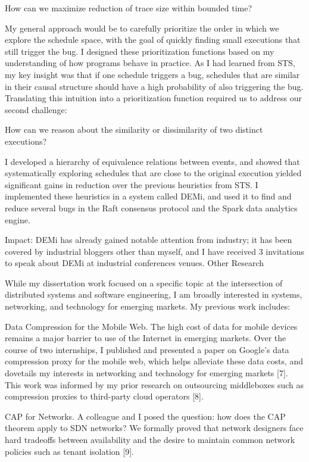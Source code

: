 	How can we maximize reduction of trace size within bounded time?

My general approach would be to carefully prioritize the order in which we explore the schedule space, with the goal of quickly finding small executions that still trigger the bug. I designed these prioritization functions based on my understanding of how programs behave in practice. As I had learned from STS, my key insight was that if one schedule triggers a bug, schedules that are similar in their causal structure should have a high probability of also triggering the bug. Translating this intuition into a prioritization function required us to address our second challenge: 

How can we reason about the similarity or dissimilarity of two distinct executions?

I developed a hierarchy of equivalence relations between events, and showed
that systematically exploring schedules that are close to the original
execution yielded significant gains in reduction over the previous
heuristics from STS. I implemented these heuristics in a system called DEMi,
and used it to find and reduce several bugs in the Raft consensus protocol and the Spark data analytics engine.

Impact: DEMi has already gained notable attention from industry; it has been covered by industrial bloggers other than myself, and I have received 3 invitations to speak about DEMi at industrial conferences venues.
Other Research

While my dissertation work focused on a specific topic at the intersection of distributed systems and software engineering, I am broadly interested in systems, networking, and technology for emerging markets. My previous work includes:

Data Compression for the Mobile Web. The high cost of data for mobile devices remains a major barrier to use of the Internet in emerging markets. Over the course of two internships, I published and presented a paper on Google’s data compression proxy for the mobile web, which helps alleviate these data costs, and dovetails my interests in networking and technology for emerging markets [7]. This work was informed by my prior research on outsourcing middleboxes such as compression proxies to third-party cloud operators [8].

CAP for Networks. A colleague and I posed the question: how does the CAP theorem apply to SDN networks? We formally proved that network designers face hard tradeoffs between availability and the desire to maintain common network policies such as tenant isolation [9].

